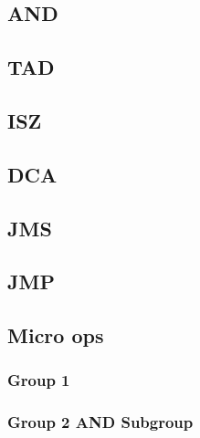 \documentclass[12pt]{article}
\begin{document}
\subsection{AND}

\newpage
\subsection{TAD}

\subsection{ISZ}

\newpage
\subsection{DCA}

\subsection{JMS}

\newpage
\subsection{JMP}


\subsection{Micro ops}
\subsubsection{Group 1}

\subsubsection{Group 2 AND Subgroup}

\newpage



\end{document}
